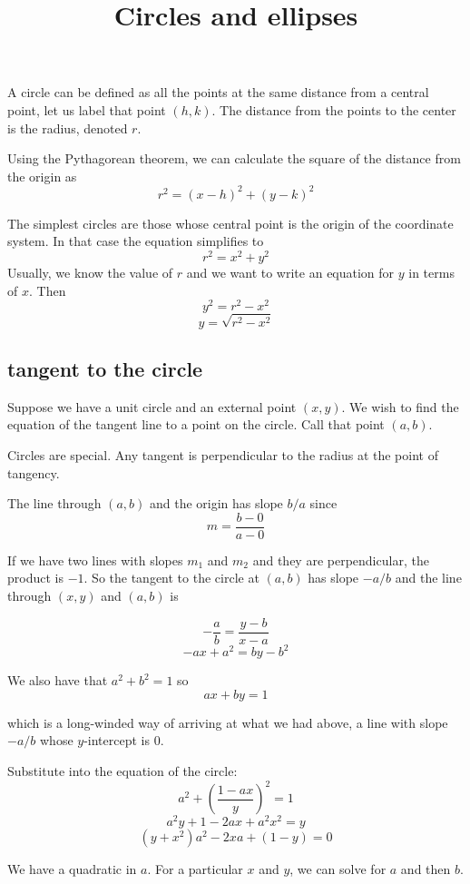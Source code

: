 \documentclass[11pt, oneside]{article}
\title{Circles and ellipses}
\date{}
\begin{document}
\maketitle
\Large

A circle can be defined as all the points at the same distance from a central point, let us label that point $(h,k)$.  The distance from the points to the center is the radius, denoted $r$.

Using the Pythagorean theorem, we can calculate the square of the distance from the origin as
\[ r^2 = (x - h)^2 + (y - k)^2 \]

The simplest circles are those whose central point is the origin of the coordinate system.  In that case the equation  simplifies to 
\[ r^2 = x^2 + y^2 \]
Usually, we know the value of $r$ and we want to write an equation for $y$ in terms of $x$.  Then
\[ y^2 = r^2 - x^2 \]
\[ y = \sqrt{r^2 - x^2} \]

\subsection*{tangent to the circle}

Suppose we have a unit circle and an external point $(x,y)$.  We wish to find the equation of the tangent line to a point on the circle.  Call that point $(a,b)$.

Circles are special.  Any tangent is perpendicular to the radius at the point of tangency.  

The line through $(a,b)$ and the origin has slope $b/a$ since
\[ m = \frac{b - 0}{a - 0} \]

If we have two lines with slopes $m_1$ and $m_2$ and they are perpendicular, the product is $-1$.  So the tangent to the circle at $(a,b)$ has slope $-a/b$ and the line through $(x,y)$ and $(a,b)$ is

\[ -\frac{a}{b} = \frac{y - b}{x - a} \]
\[ - ax + a^2 = by - b^2 \]

We also have that $a^2 + b^2 = 1$ so
\[ ax + by = 1 \]

which is a long-winded way of arriving at what we had above, a line with slope $-a/b$ whose $y$-intercept is $0$.

Substitute into the equation of the circle:
\[ a^2 + (\frac{1 - ax}{y})^2 = 1 \]
\[ a^2y + 1 - 2ax + a^2x^2 = y \]
\[ (y + x^2)a^2 - 2xa + (1 - y) = 0 \]

We have a quadratic in $a$.  For a particular $x$ and $y$, we can solve for $a$ and then $b$.
\end{document}

